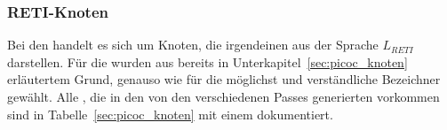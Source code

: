 \subsubsection{RETI-Knoten}
\label{sec:reti_knoten}

Bei den  handelt es sich um Knoten, die irgendeinen  aus der Sprache $L_{RETI}$ darstellen. Für die  wurden aus bereits in Unterkapitel~\ref{sec:picoc_knoten} erläutertem Grund, genauso wie für die  möglichst  und  verständliche Bezeichner gewählt. Alle , die in den von den verschiedenen Passes generierten  vorkommen sind in Tabelle~\ref{sec:picoc_knoten} mit einem  dokumentiert.

